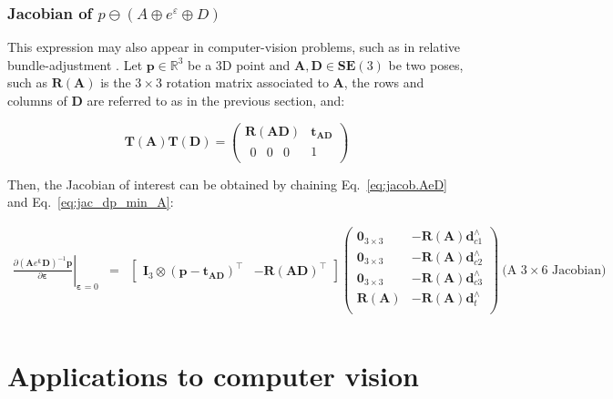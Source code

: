 \documentclass[a4paper,11pt]{report}
\newcommand{\E}{{\bm{\varepsilon}}}
\newcommand{\A}{{\mathbf{A}}}
\newcommand{\D}{{\mathbf{D}}}
\newcommand{\I}{{\mathbf{I}}}
\newcommand{\hatop}[1]{#1^\wedge}
\begin{document}
\subsection{Jacobian of $p \ominus (A \oplus e^\varepsilon \oplus D)$}
\label{eq:jacob_pmA_e_D}

This expression may also appear in computer-vision problems,
such as in relative bundle-adjustment \cite{sibley2009rba}.
Let $\mathbf{p} \in \mathbb{R}^3$ be a 3D point
and $\A,\D \in \mathbf{SE}(3)$ be two poses, such as
$\mathbf{R}(\A)$ is the $3\times 3$ rotation matrix associated to $\A$,
the rows and columns of $\D$ are referred to as in the previous section,
and:

\begin{equation}
\mathbf{T}(\A) \mathbf{T}(\D)
=
\left(
\begin{array}{c|c}
 \mathbf{R}(\A\D) & \mathbf{t_{AD}} \\
\hline
 \begin{array}{ccc} 0 & 0 & 0 \end{array} & 1
\end{array}
\right)
\end{equation}

Then, the Jacobian of interest can be obtained by chaining Eq.~\ref{eq:jacob.AeD} and Eq.~\ref{eq:jac_dp_min_A}:

\begin{eqnarray}
\left. \frac{\partial (\A e^\E \D)^{-1} \mathbf{p}}{\partial \E} \right|_{\E = 0}
&=&
\left[
\begin{array}{cc}
 \I_3 \otimes (\mathbf{p}-\mathbf{t_{AD}})^\top  & -\mathbf{R}(\A\D)^\top
\end{array}
\right]
\left(
\begin{array}{cc}
 \mathbf{0}_{3\times 3}  & -\mathbf{R}(\A) \hatop{\mathbf{d}}_{c1} \\
 \mathbf{0}_{3\times 3}  & -\mathbf{R}(\A) \hatop{\mathbf{d}}_{c2} \\
 \mathbf{0}_{3\times 3}  & -\mathbf{R}(\A) \hatop{\mathbf{d}}_{c3} \\
 \mathbf{R}(\A)        & -\mathbf{R}(\A) \hatop{\mathbf{d}}_{t} \\
\end{array}
\right)
~ \text{(A $3 \times 6$ Jacobian)} \nonumber
\\
~ %
\end{eqnarray}



\appendix

\chapter{Applications to computer vision}
\label{ch:apx:cv}
\end{document}
